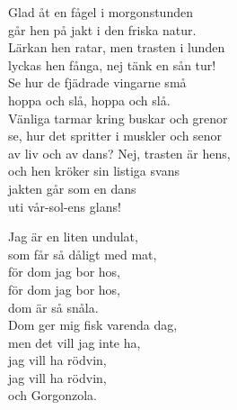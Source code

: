 \documentclass[a6paper, 10pt, twoside]{article}
\begin{document}
\begin{center}
\end{center}
\begin{lyrics}
\small Glad åt en fågel i morgonstunden\\ 
går hen på jakt i den friska natur.\\ 
Lärkan hen ratar, men trasten i lunden\\ 
lyckas hen fånga, nej tänk en sån tur!
\vspace{5pt}\\ 
Se hur de fjädrade vingarne små\\ 
hoppa och slå, hoppa och slå.\\ 
Vänliga tarmar kring buskar och grenor\\ 
se, hur det spritter i muskler och senor\\ 
av liv och av dans? Nej, trasten är hens,\\
och hen kröker sin listiga svans\\ 
jakten går som en dans\\
uti vår-sol-ens glans! \\
\end{lyrics}
\begin{center}
\end{center}
\begin{lyrics}
\small Jag är en liten undulat,\\
som får så dåligt med mat,\\
för dom jag bor hos,\\
för dom jag bor hos,\\
dom är så snåla.\\\digitalonly{\\}
Dom ger mig fisk varenda dag,\\
men det vill jag inte ha,\\
jag vill ha rödvin,\\
jag vill ha rödvin,\\
och Gorgonzola.
\end{lyrics}
\end{document}
